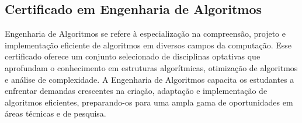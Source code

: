 \subsection{Certificado em Engenharia de Algoritmos}

Engenharia de Algoritmos se refere à especialização na compreensão, projeto e implementação eficiente de algoritmos em diversos campos da computação. Esse certificado oferece um conjunto selecionado de disciplinas optativas que aprofundam o conhecimento em estruturas algorítmicas, otimização de algoritmos e análise de complexidade. A Engenharia de Algoritmos capacita os estudantes a enfrentar demandas crescentes na criação, adaptação e implementação de algoritmos eficientes, preparando-os para uma ampla gama de oportunidades em áreas técnicas e de pesquisa.


